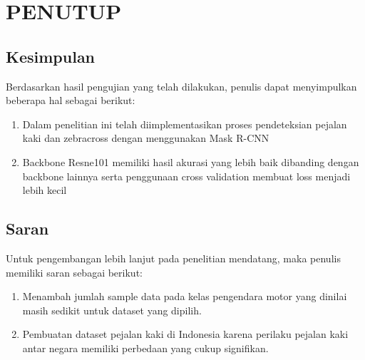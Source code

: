 \chapter{PENUTUP}
\label{chap:penutup}


\section{Kesimpulan}
\label{sec:kesimpulan}

Berdasarkan hasil pengujian yang telah dilakukan, penulis dapat menyimpulkan beberapa hal sebagai berikut:

\begin{enumerate}[nolistsep]

  \item Dalam penelitian ini telah diimplementasikan proses pendeteksian pejalan kaki dan zebracross dengan menggunakan Mask R-CNN
  \item Backbone Resne101 memiliki hasil akurasi yang lebih baik dibanding dengan backbone lainnya serta penggunaan cross validation membuat loss menjadi lebih kecil
  
\end{enumerate}

\section{Saran}
\label{sec:saran}

Untuk pengembangan lebih lanjut pada penelitian mendatang, maka penulis memiliki saran sebagai berikut:

\begin{enumerate}[nolistsep]

  \item Menambah jumlah sample data pada kelas pengendara motor yang dinilai masih sedikit untuk dataset yang dipilih.

  \item Pembuatan dataset pejalan kaki di Indonesia karena perilaku pejalan kaki antar negara memiliki perbedaan yang cukup signifikan.

\end{enumerate}
